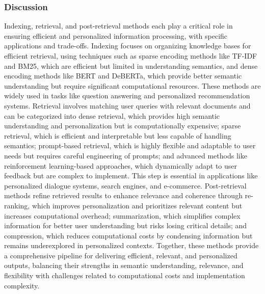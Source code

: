 \subsubsection{\textbf{Discussion}}
Indexing, retrieval, and post-retrieval methods each play a critical role in ensuring efficient and personalized information processing, with specific applications and trade-offs. Indexing focuses on organizing knowledge bases for efficient retrieval, using techniques such as sparse encoding methods like TF-IDF and BM25, which are efficient but limited in understanding semantics, and dense encoding methods like BERT and DeBERTa, which provide better semantic understanding but require significant computational resources. These methods are widely used in tasks like question answering and personalized recommendation systems. Retrieval involves matching user queries with relevant documents and can be categorized into dense retrieval, which provides high semantic understanding and personalization but is computationally expensive; sparse retrieval, which is efficient and interpretable but less capable of handling semantics; prompt-based retrieval, which is highly flexible and adaptable to user needs but requires careful engineering of prompts; and advanced methods like reinforcement learning-based approaches, which dynamically adapt to user feedback but are complex to implement. This step is essential in applications like personalized dialogue systems, search engines, and e-commerce. Post-retrieval methods refine retrieved results to enhance relevance and coherence through re-ranking, which improves personalization and prioritizes relevant content but increases computational overhead; summarization, which simplifies complex information for better user understanding but risks losing critical details; and compression, which reduces computational costs by condensing information but remains underexplored in personalized contexts. Together, these methods provide a comprehensive pipeline for delivering efficient, relevant, and personalized outputs, balancing their strengths in semantic understanding, relevance, and flexibility with challenges related to computational costs and implementation complexity.